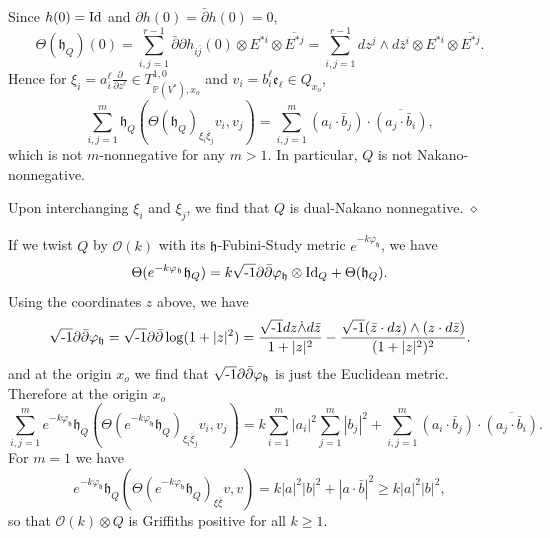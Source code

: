 \documentclass[12pt,hidelinks]{amsart}
\newcommand{\cO}{{\mathcal O}}
\newcommand{\fe}{{\mathfrak e}}
\newcommand{\fh}{{\mathfrak h}}
\newcommand{\vp}{\varphi}
\newcommand{\bbP}{{\mathbb P}}
\newcommand{\red}{\hfill $\diamond$}
\newcommand{\di}{\partial}
\newcommand{\dbar}{\bar \partial}
\newcommand{\ii}{\sqrt{\text{\rm -}1}}
\newcommand{\tensor}{\otimes}
\begin{document}
Since $h(0) = {\rm Id}$ and  $\di h(0)= \dbar h(0) = 0$, 
\[
\Theta (\fh _Q) (0) = \sum _{i,j =1} ^{r-1}  \dbar \di h_{i \bar j} (0) \tensor E^{*i} \tensor \overline{E^{*j}} = \sum _{i,j =1} ^{r-1} dz^j \wedge d\bar z ^i \tensor E^{*i} \tensor \overline{E^{*j}}.
\]
Hence for $\xi _i = a^{\ell}_i  \frac{\di}{\di z ^{\ell}} \in T^{1,0}_{\bbP(V^*),x_o}$ and $v _i = b^{\ell}_i \fe_{\ell} \in Q_{x_o}$, 
\begin{equation}\label{Q-curv-formula}
\sum _{i,j=1} ^m \fh _Q(\Theta (\fh_Q)_{\xi _i \bar \xi _j}v_i, v_j) = \sum _{i,j=1} ^m (a_i \cdot \bar b_j) \cdot \overline{(a_j \cdot \bar b _i)},
\end{equation}
which is not $m$-nonnegative for any $m > 1$.  In particular, $Q$ is not Nakano-nonnegative.

\begin{s-rmk}
Upon interchanging $\xi _i$ and $\xi _j$, we find that $Q$ is dual-Nakano nonnegative.
\red
\end{s-rmk}

If we twist $Q$ by $\cO (k)$ with its $\fh$-Fubini-Study metric $e^{-k\vp_{\fh}}$, we have 
\[
\Theta (e^{-k \vp_{\fh}} \fh _Q) = k \ii \di \dbar \vp _{\fh} \tensor {\rm Id}_Q + \Theta (\fh _Q).
\]
Using the coordinates $z$ above, we have 
\[
\ii \di \dbar \vp _{\fh} = \ii \di \dbar \log (1+|z|^2) = \frac{\ii dz \dot \wedge d\bar z }{1+|z|^2} - \frac{\ii (\bar z \cdot dz) \wedge (z \cdot d\bar z)}{(1+|z|^2)^2}.
\]
and at the origin $x_o$ we find that  $\ii \di \dbar \vp _{\fh}$ is just the Euclidean metric.  Therefore at the origin $x_o$
\[
\sum _{i,j=1} ^m e^{-k \vp_{\fh}}\fh _Q(\Theta (e^{-k \vp_{\fh}}\fh_Q)_{\xi _i \bar \xi _j}v_i, v_j) = k \sum _{i=1} ^m |a_i|^2 \sum _{j=1} ^m |b_j|^2 + \sum _{i,j=1} ^m (a_i \cdot \bar b _j) \cdot \overline{(a_j \cdot \bar b_i)}.
\]
For $m = 1$ we have 
\[
e^{-k \vp_{\fh}}\fh _Q(\Theta (e^{-k \vp_{\fh}}\fh_Q)_{\xi \bar \xi}v, v) = k|a|^2|b|^2 + |a \cdot \bar b|^2 \ge k |a|^2|b|^2,
\]
so that $\cO (k)\tensor Q$ is Griffiths positive for all $k \ge 1$.  
\end{document}
